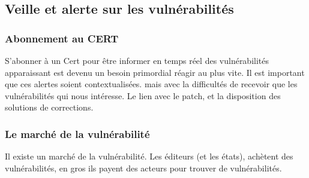 \subsection{Veille et alerte sur les vulnérabilités}

\subsubsection{Abonnement au CERT}

S’abonner à un Cert pour être informer en temps réel des vulnérabilités apparaissant est devenu un besoin primordial réagir au plus vite. Il est important que ces alertes soient contextualisées.  mais avec la difficultés de recevoir que les vulnérabilités qui nous intéresse. Le lien avec le patch, et la disposition des solutions de corrections.

\subsubsection{Le marché de la vulnérabilité}

Il existe un marché de la vulnérabilité. Les éditeurs (et les états), achètent des vulnérabilités, en gros ils payent des acteurs pour trouver de vulnérabilités.


 

